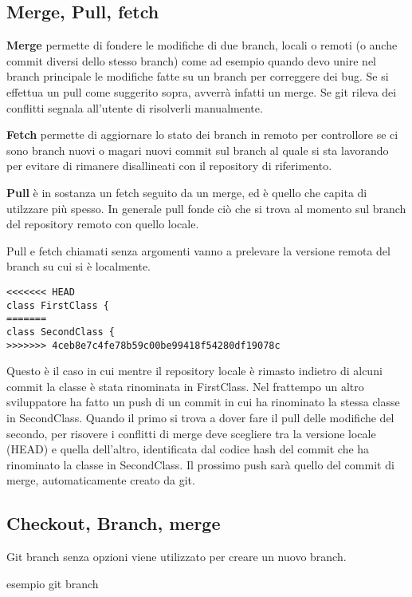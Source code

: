 \documentclass{article} \usepackage[textwidth=18cm,textheight=18cm]{geometry}
\begin{document}
\subsection{Merge, Pull, fetch}

\textbf{Merge} permette di fondere le modifiche di due branch, locali o remoti (o anche
commit diversi dello stesso branch) come ad esempio quando devo unire nel branch principale
le modifiche fatte su un branch per correggere dei bug. Se si effettua un pull come suggerito
sopra, avverrà infatti un merge. Se git rileva dei conflitti segnala all'utente
di risolverli manualmente. 

\textbf{Fetch} permette di aggiornare lo stato dei branch in remoto per controllore
se ci sono branch nuovi o magari nuovi commit sul branch al quale si sta lavorando per evitare
di rimanere disallineati con il repository di riferimento.

\textbf{Pull} è in sostanza un fetch seguito da un merge, ed è quello che capita di
utilzzare più spesso. In generale pull fonde ciò che si trova al momento sul branch del 
repository remoto con quello locale.

Pull e fetch chiamati senza argomenti vanno a prelevare la versione remota del
branch su cui si è localmente.

\begin{verbatim}
<<<<<<< HEAD
class FirstClass {
=======
class SecondClass {
>>>>>>> 4ceb8e7c4fe78b59c00be99418f54280df19078c
\end{verbatim}

Questo è il caso in cui mentre il repository locale è rimasto indietro di alcuni
commit la classe è stata rinominata in FirstClass. Nel frattempo un altro
sviluppatore ha fatto un push di un commit in cui ha rinominato la stessa classe in
SecondClass. Quando il primo si trova a dover fare il pull delle modifiche del
secondo, per risovere i conflitti di merge deve scegliere tra la versione locale
(HEAD) e quella dell'altro,
identificata dal codice hash del commit che ha rinominato la classe in
SecondClass. Il prossimo push sarà quello del commit di merge, automaticamente
creato da git.

\subsection{Checkout, Branch, merge}

Git branch senza opzioni viene utilizzato per creare un nuovo branch.

esempio git branch
\end{document}
